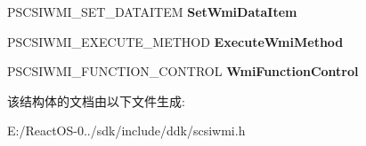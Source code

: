\begin{DoxyCompactItemize}
P\+S\+C\+S\+I\+W\+M\+I\+\_\+\+S\+E\+T\+\_\+\+D\+A\+T\+A\+I\+T\+EM {\bfseries Set\+Wmi\+Data\+Item}
\item 
\mbox{\label{struct___s_c_s_i_w_m_i_l_i_b___c_o_n_t_e_x_t_ab8fbee16b8f70d174a032ca607cbbca2}} 
P\+S\+C\+S\+I\+W\+M\+I\+\_\+\+E\+X\+E\+C\+U\+T\+E\+\_\+\+M\+E\+T\+H\+OD {\bfseries Execute\+Wmi\+Method}
\item 
\mbox{\label{struct___s_c_s_i_w_m_i_l_i_b___c_o_n_t_e_x_t_a1891c5da1b1734b2696a5e6e2fbafcca}} 
P\+S\+C\+S\+I\+W\+M\+I\+\_\+\+F\+U\+N\+C\+T\+I\+O\+N\+\_\+\+C\+O\+N\+T\+R\+OL {\bfseries Wmi\+Function\+Control}
\end{DoxyCompactItemize}


该结构体的文档由以下文件生成\+:\begin{DoxyCompactItemize}
\item 
E\+:/\+React\+O\+S-\/0../sdk/include/ddk/scsiwmi.\+h\end{DoxyCompactItemize}

